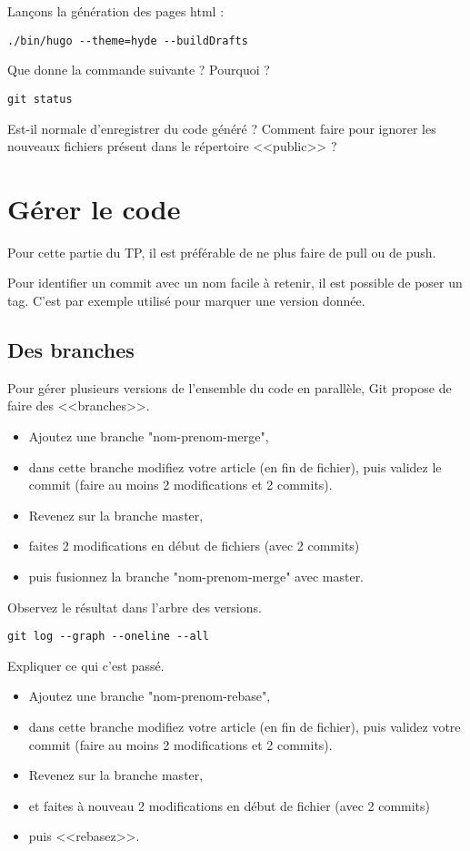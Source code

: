 \documentclass[a4paper]{article}
\begin{document}
Lançons la génération des pages html : 
\begin{verbatim}
./bin/hugo --theme=hyde --buildDrafts
\end{verbatim}

Que donne la commande suivante ? Pourquoi ? 
\begin{verbatim}
git status
\end{verbatim}

Est-il normale d'enregistrer du code généré ?  Comment faire pour ignorer les nouveaux fichiers présent dans le répertoire <<public>> ?

\section{Gérer le code}

Pour cette partie du TP, il est préférable de ne plus faire de pull ou de push.

Pour identifier un commit avec un nom facile à retenir, il est possible de poser un tag. C'est par exemple utilisé pour marquer une version donnée.

\subsection{Des branches}

Pour gérer plusieurs versions de l'ensemble du code en parallèle, Git propose de faire des <<branches>>.

\begin{itemize}
  \item Ajoutez une branche "nom-prenom-merge", 
  \item dans cette branche modifiez votre article (en fin de fichier), puis validez le commit (faire au moins 2 modifications et 2 commits). 
  \item Revenez sur la branche master, 
  \item faites 2 modifications en début de fichiers (avec 2 commits) 
  \item puis fusionnez la branche "nom-prenom-merge" avec master.
\end{itemize}

Observez le résultat dans l'arbre des versions. 
\begin{verbatim}
git log --graph --oneline --all
\end{verbatim}

Expliquer ce qui c'est passé.

\begin{itemize}
  \item Ajoutez une branche "nom-prenom-rebase", 
  \item dans cette branche modifiez votre article (en fin de fichier), puis validez votre commit (faire au moins 2 modifications et 2 commits). 
  \item Revenez sur la branche master, 
  \item et faites à nouveau 2 modifications en début de fichier (avec 2 commits) 
  \item puis <<rebasez>>.
\end{itemize}
\end{document}
